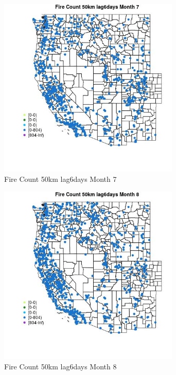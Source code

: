 \begin{figure} 
\centering  
\includegraphics[width=0.77\textwidth]{Code_Outputs/Report_ML_input_PM25_Step4_part_f_de_duplicated_aveswNAs_MapObsMo7Fire_Count_50km_lag6days.jpg} 
\caption{\label{fig:Report_ML_input_PM25_Step4_part_f_de_duplicated_aveswNAsMapObsMo7Fire_Count_50km_lag6days}Fire Count 50km lag6days Month 7} 
\end{figure} 
 

\clearpage 

\begin{figure} 
\centering  
\includegraphics[width=0.77\textwidth]{Code_Outputs/Report_ML_input_PM25_Step4_part_f_de_duplicated_aveswNAs_MapObsMo8Fire_Count_50km_lag6days.jpg} 
\caption{\label{fig:Report_ML_input_PM25_Step4_part_f_de_duplicated_aveswNAsMapObsMo8Fire_Count_50km_lag6days}Fire Count 50km lag6days Month 8} 
\end{figure} 
 

